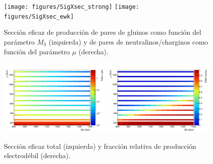 \begin{figure}[!htb]
  \centering
  \texttt{[image: figures/SigXsec\_strong]}
  \texttt{[image: figures/SigXsec\_ewk]}

  \caption{Sección eficaz de producción de pares de gluinos como función del parámetro $M_3$ (izquierda)
    y de pares de neutralinos/charginos como función del parámetro $\mu$ (derecha).}
  \label{fig:signal_xs}
\end{figure}

\begin{figure}[!htb]
  \centering
  \includegraphics[width=0.49\textwidth]{figures/SigXsec_total}
  \includegraphics[width=0.49\textwidth]{figures/SigXsec_ewkFrac}
  \caption{Sección eficaz total (izquierda) y fracción relativa
    de producción electrodébil (derecha).}
  \label{fig:signal_xs_total}
\end{figure}

